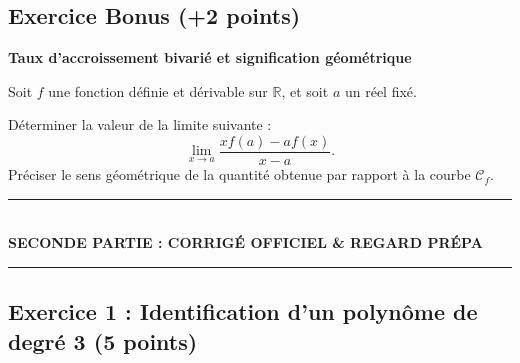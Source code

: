 \documentclass[11pt,a4paper]{article}
\newcommand{\R}{\mathbb{R}}
\begin{document}
\subsection*{Exercice Bonus \hfill \normalfont\normalsize (+2 points)}
\textbf{Taux d'accroissement bivarié et signification géométrique}

\medskip
Soit $f$ une fonction définie et dérivable sur $\R$, et soit $a$ un réel fixé.

Déterminer la valeur de la limite suivante :
\[
\lim_{x \to a} \frac{x f(a) - a f(x)}{x - a}.
\]
Préciser le sens géométrique de la quantité obtenue par rapport à la courbe $\mathcal{C}_f$.

\newpage

\begin{center}
    \rule{0.35\textwidth}{0.8pt}\\[0.15cm]
    {\Large \bfseries SECONDE PARTIE : CORRIGÉ OFFICIEL \& REGARD PRÉPA}\\[0.1cm]
    \rule{0.35\textwidth}{0.8pt}
\end{center}

\vspace{0.3cm}

\subsection*{Exercice 1 : Identification d'un polynôme de degré 3 \hfill \normalfont\normalsize (5 points)}
\end{document}
